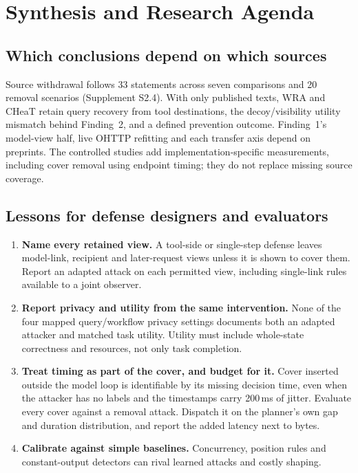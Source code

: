 \section{Synthesis and Research Agenda}\label{sec:agenda}
\subsection{Which conclusions depend on which sources}\label{sec:sensitivity}
Source withdrawal follows 33 statements across seven comparisons and 20 removal scenarios (Supplement S2.4). With only published texts, WRA and CHeaT retain query recovery from tool destinations, the decoy/visibility utility mismatch behind Finding~2, and a defined prevention outcome. Finding~1's model-view half, live OHTTP refitting and each transfer axis depend on preprints. The controlled studies add implementation-specific measurements, including cover removal using endpoint timing; they do not replace missing source coverage.

\subsection{Lessons for defense designers and evaluators}
\begin{enumerate}
\item \textbf{Name every retained view.} A tool-side or single-step defense leaves model-link, recipient and later-request views unless it is shown to cover them. Report an adapted attack on each permitted view, including single-link rules available to a joint observer.
\item \textbf{Report privacy and utility from the same intervention.} None of the four mapped query/workflow privacy settings documents both an adapted attacker and matched task utility. Utility must include whole-state correctness and resources, not only task completion.
\item \textbf{Treat timing as part of the cover, and budget for it.} Cover inserted outside the model loop is identifiable by its missing decision time, even when the attacker has no labels and the timestamps carry 200\,ms of jitter. Evaluate every cover against a removal attack. Dispatch it on the planner's own gap and duration distribution, and report the added latency next to bytes.
\item \textbf{Calibrate against simple baselines.} Concurrency, position rules and constant-output detectors can rival learned attacks and costly shaping.
\end{enumerate}

